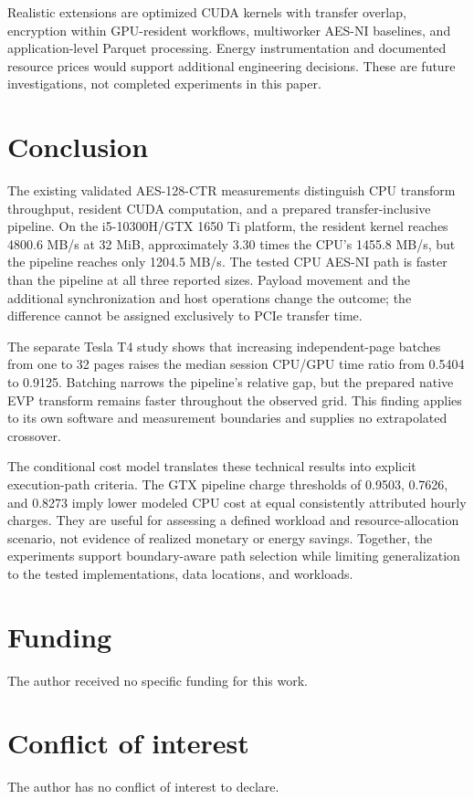 \documentclass[11pt,a4paper]{article}
\begin{document}
Realistic extensions are optimized CUDA kernels with transfer overlap, encryption within GPU-resident workflows, multiworker AES-NI baselines, and application-level Parquet processing. Energy instrumentation and documented resource prices would support additional engineering decisions. These are future investigations, not completed experiments in this paper.

\FloatBarrier
\section{Conclusion}
The existing validated AES-128-CTR measurements distinguish CPU transform throughput, resident CUDA computation, and a prepared transfer-inclusive pipeline. On the i5-10300H/GTX 1650 Ti platform, the resident kernel reaches 4800.6 MB/s at 32 MiB, approximately 3.30 times the CPU's 1455.8 MB/s, but the pipeline reaches only 1204.5 MB/s. The tested CPU AES-NI path is faster than the pipeline at all three reported sizes. Payload movement and the additional synchronization and host operations change the outcome; the difference cannot be assigned exclusively to PCIe transfer time.

The separate Tesla T4 study shows that increasing independent-page batches from one to 32 pages raises the median session CPU/GPU time ratio from 0.5404 to 0.9125. Batching narrows the pipeline's relative gap, but the prepared native EVP transform remains faster throughout the observed grid. This finding applies to its own software and measurement boundaries and supplies no extrapolated crossover.

The conditional cost model translates these technical results into explicit execution-path criteria. The GTX pipeline charge thresholds of 0.9503, 0.7626, and 0.8273 imply lower modeled CPU cost at equal consistently attributed hourly charges. They are useful for assessing a defined workload and resource-allocation scenario, not evidence of realized monetary or energy savings. Together, the experiments support boundary-aware path selection while limiting generalization to the tested implementations, data locations, and workloads.

\section*{Funding}
The author received no specific funding for this work.

\section*{Conflict of interest}
The author has no conflict of interest to declare.

\begingroup\fontsize{10}{12}\selectfont\sloppy
\printbibliography[title={References}]
\endgroup
\end{document}
